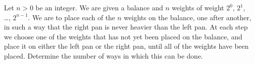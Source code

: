 Let $n > 0$ be an integer.
We are given a balance and $n$ weights of weight $2^0$, $2^1$, \dots, $2^{n-1}$.
We are to place each of the $n$ weights on the balance, one after another,
in such a way that the right pan is never heavier than the left pan.
At each step we choose one of the weights
that has not yet been placed on the balance,
and place it on either the left pan or the right pan,
until all of the weights have been placed.
Determine the number of ways in which this can be done.